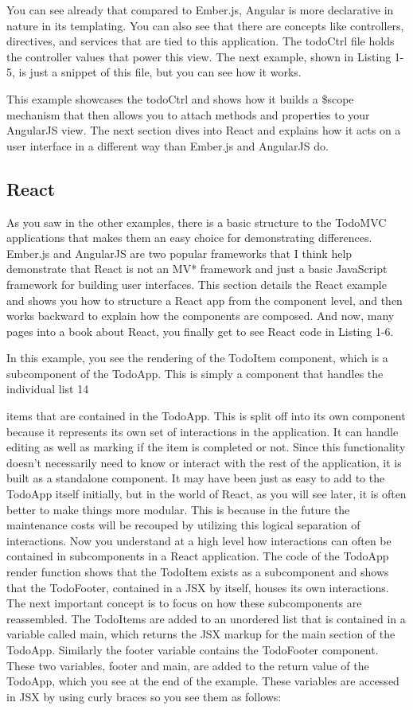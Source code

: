 You can see already that compared to Ember.js, Angular is more declarative in nature in its templating. You can also see that there are concepts like controllers, directives, and services that are tied to this application. The todoCtrl file holds the controller values that power this view. The next example, shown in Listing 1-5, is just a snippet of this file, but you can see how it works.


This example showcases the todoCtrl and shows how it builds a \$scope mechanism that then allows you to attach methods and properties to your AngularJS view. The next section dives into React and explains how it acts on a user interface in a different way than Ember.js and AngularJS do.


\subsection{React}

As you saw in the other examples, there is a basic structure to the TodoMVC applications that makes them an easy choice for demonstrating differences. Ember.js and AngularJS are two popular frameworks that I think help demonstrate that React is not an MV* framework and just a basic JavaScript framework for building user interfaces. This section details the React example and shows you how to structure a React app from the component level, and then works backward to explain how the components are composed. And now, many pages into a book about React, you finally get to see React code in Listing 1-6.

In this example, you see the rendering of the TodoItem component, which is a
subcomponent of the TodoApp. This is simply a component that handles the individual list 14

items that are contained in the TodoApp. This is split off into its own component because
it represents its own set of interactions in the application. It can handle editing as well as marking if the item is completed or not. Since this functionality doesn’t necessarily need to know or interact with the rest of the application, it is built as a standalone component. It may have been just as easy to add to the TodoApp itself initially, but in the world of React, as you will see later, it is often better to make things more modular. This is because in the future the maintenance costs will be recouped by utilizing this logical separation of interactions.
Now you understand at a high level how interactions can often be contained in subcomponents in a React application. The code of the TodoApp render function shows that the TodoItem exists as a subcomponent and shows that the TodoFooter, contained in a JSX by itself, houses its own interactions. The next important concept is to focus on how these subcomponents are reassembled. The TodoItems are added to an unordered list that is contained in a variable called main, which returns the JSX markup for the main section of the TodoApp. Similarly the footer variable contains the TodoFooter component. These two variables, footer and main, are added to the return value of the TodoApp, which you see at the end of the example. These variables are accessed in JSX by using curly braces so you see them as follows:


